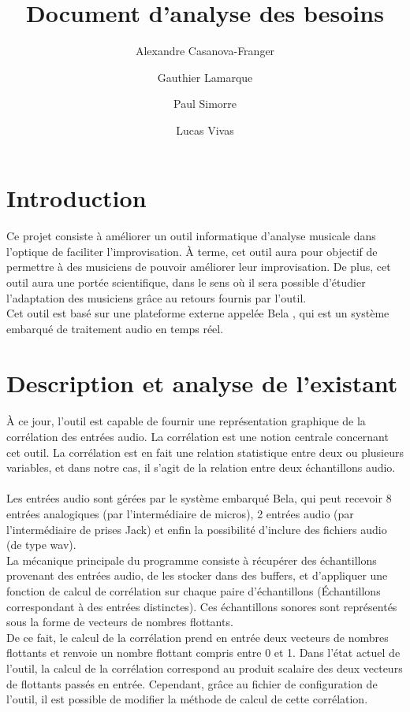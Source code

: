 \documentclass{article}
\title{Document d'analyse des besoins}
\author{Alexandre Casanova-Franger\\
        \and
        Gauthier Lamarque\\
        \and
        Paul Simorre\\
        \and
        Lucas Vivas\\}
\begin{document}
  \maketitle
  \section{Introduction}
    \paragraph{}
    Ce projet consiste à améliorer un outil informatique d'analyse musicale dans
    l'optique de faciliter l'improvisation. À terme, cet outil aura pour
    objectif de permettre à des musiciens de pouvoir améliorer leur
    improvisation. De plus, cet outil aura une portée scientifique, dans le sens
    où il sera possible d'étudier l'adaptation des musiciens grâce au retours
    fournis par l'outil. \\
    Cet outil est basé sur une plateforme externe appelée Bela \cite{BELA},
    qui est un système embarqué de traitement audio en temps réel.
  \section{Description et analyse de l'existant}
    \paragraph{}
    À ce jour, l'outil est capable de fournir une représentation graphique de la
    corrélation des entrées audio. La corrélation est une notion centrale
    concernant cet outil. La corrélation est en fait une relation statistique
    entre deux ou plusieurs variables, et dans notre cas, il s'agit de la
    relation entre deux échantillons audio.
    \paragraph{}
    Les entrées audio sont gérées par le système embarqué Bela, qui peut
    recevoir 8 entrées analogiques (par l'intermédiaire de micros), 2 entrées
    audio (par l'intermédiaire de prises Jack) et enfin la possibilité d'inclure
    des fichiers audio (de type wav).\\
    La mécanique principale du programme consiste à récupérer des échantillons
    provenant des entrées audio, de les stocker dans des buffers, et d'appliquer
    une fonction de calcul de corrélation sur chaque paire d'échantillons
    (\'{E}chantillons correspondant à des entrées distinctes). Ces échantillons
    sonores sont représentés sous la forme de vecteurs de nombres flottants.\\
    De ce fait, le calcul de la corrélation prend en entrée deux vecteurs de
    nombres flottants et renvoie un nombre flottant compris entre 0 et 1.
    Dans l'état actuel de l'outil, la calcul de la corrélation correspond au
    produit scalaire des deux vecteurs de flottants passés en entrée. Cependant,
    grâce au fichier de configuration de l'outil, il est possible de modifier la
    méthode de calcul de cette corrélation.
\end{document}
